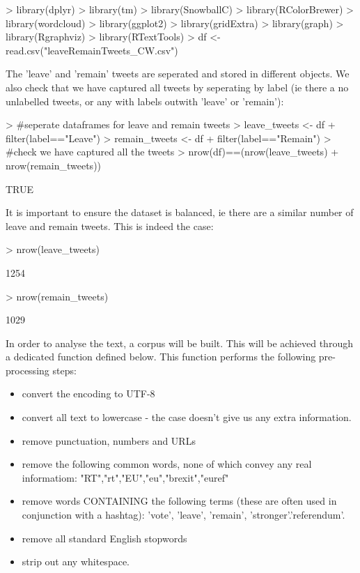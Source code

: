\documentclass[10pt]{article}
\begin{document}
\begin{Schunk}
\begin{Sinput}
> library(dplyr)
> library(tm)
> library(SnowballC)
> library(RColorBrewer)
> library(wordcloud)
> library(ggplot2)
> library(gridExtra)
> library(graph)
> library(Rgraphviz)
> library(RTextTools)
> df <- read.csv("leaveRemainTweets_CW.csv")
\end{Sinput}
\end{Schunk}
The 'leave' and 'remain' tweets are seperated and stored in different objects. We also check that we have captured all tweets by seperating by label (ie there a no unlabelled tweets, or any with labels outwith 'leave' or 'remain'):
\begin{Schunk}
\begin{Sinput}
> #seperate dataframes for leave and remain tweets
> leave_tweets <- df%
+   filter(label=="Leave")
> remain_tweets <- df%
+   filter(label=="Remain")
> #check we have captured all the tweets
> nrow(df)==(nrow(leave_tweets) + nrow(remain_tweets))
\end{Sinput}
\begin{Soutput}
[1] TRUE
\end{Soutput}
\end{Schunk}
It is important to ensure the dataset is balanced, ie there are a similar number of leave and remain tweets. This is indeed the case:
\begin{Schunk}
\begin{Sinput}
> nrow(leave_tweets)
\end{Sinput}
\begin{Soutput}
[1] 1254
\end{Soutput}
\begin{Sinput}
> nrow(remain_tweets)
\end{Sinput}
\begin{Soutput}
[1] 1029
\end{Soutput}
\end{Schunk}

In order to analyse the text, a corpus will be built. This will be achieved through a dedicated function defined below. This function performs the following pre-processing steps:

\begin{itemize}
  \item convert the encoding to UTF-8
  \item convert all text to lowercase - the case doesn't give us any extra information.
  \item remove punctuation, numbers and URLs
  \item remove the following common words, none of which convey any real informatiom: "RT","rt","EU","eu","brexit","euref"
  \item remove words CONTAINING the following terms (these are often used in conjunction with a hashtag): 'vote', 'leave', 'remain', 'stronger'.'referendum'.
  \item remove all standard English stopwords
  \item strip out any whitespace.
\end{itemize}
\end{document}
